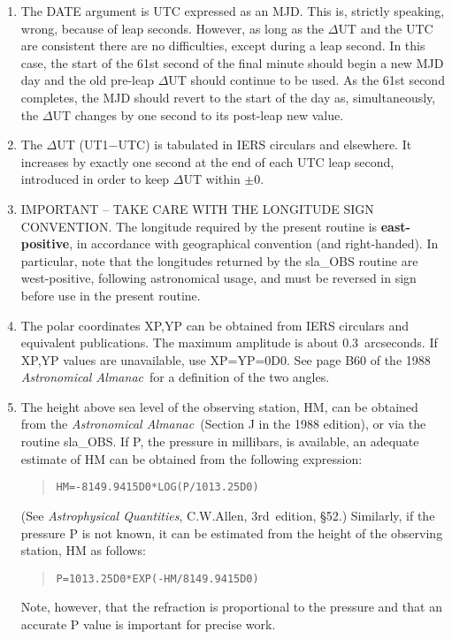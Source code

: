 {\begin{enumerate}
        Where a range of times within a limited period of a few hours
        is involved, and the highest precision is not required, call
        sla\_AOPPA once, followed by a call to sla\_AOPPAT each time the
        time changes, followed by one call per star to sla\_AOPQK.
  \item The DATE argument is UTC expressed as an MJD.  This is,
        strictly speaking, wrong, because of leap seconds.  However,
        as long as the $\Delta$UT and the UTC are consistent there
        are no difficulties, except during a leap second.  In this
        case, the start of the 61st second of the final minute should
        begin a new MJD day and the old pre-leap $\Delta$UT should
        continue to be used.  As the 61st second completes, the MJD
        should revert to the start of the day as, simultaneously,
        the $\Delta$UT changes by one second to its post-leap new value.
  \item The $\Delta$UT (UT1$-$UTC) is tabulated in IERS circulars and
        elsewhere.  It increases by exactly one second at the end of
        each UTC leap second, introduced in order to keep $\Delta$UT
        within $\pm0$.
  \item IMPORTANT -- TAKE CARE WITH THE LONGITUDE SIGN CONVENTION.  The
        longitude required by the present routine is {\bf east-positive},
        in accordance with geographical convention (and right-handed).
        In particular, note that the longitudes returned by the
        sla\_OBS routine are west-positive, following astronomical
        usage, and must be reversed in sign before use in the present
        routine.
  \item The polar coordinates XP,YP can be obtained from IERS
        circulars and equivalent publications.  The
        maximum amplitude is about 0.3~arcseconds.  If XP,YP values
        are unavailable, use XP=YP=0D0.  See page B60 of the 1988
        {\it Astronomical Almanac}\, for a definition of the two angles.
  \item The height above sea level of the observing station, HM,
        can be obtained from the {\it Astronomical Almanac}\, (Section J
        in the 1988 edition), or via the routine sla\_OBS.  If P,
        the pressure in millibars, is available, an adequate
        estimate of HM can be obtained from the following expression:
        \begin{quote}
         \verb|HM=-8149.9415D0*LOG(P/1013.25D0)|
        \end{quote}
        (See {\it Astrophysical Quantities}, C.W.Allen, 3rd~edition,
        \S52.)  Similarly, if the pressure P is not known,
        it can be estimated from the height of the observing
        station, HM as follows:
        \begin{quote}
         \verb|P=1013.25D0*EXP(-HM/8149.9415D0)|
        \end{quote}
        Note, however, that the refraction is proportional to the
        pressure and that an accurate P value is important for
        precise work.
 \end{enumerate}
}
